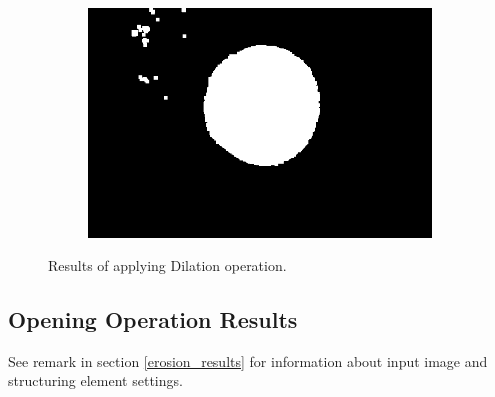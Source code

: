 \documentclass{article}
\begin{document}
\begin{figure}[H]
\begin{subfigure}{.09\textwidth}
  \label{fig:arrow}
\end{subfigure}%
\begin{subfigure}{.47\textwidth}
  \centering
  \includegraphics[width=0.97\linewidth]{_Figures/raw_data_4_dilation.png}
  \caption{}
  \label{fig:raw_4_dilation}
\end{subfigure}

\caption{Results of applying Dilation operation. }
\label{fig:dilation_results}
\end{figure}


%
%
\newpage
\subsection{Opening Operation Results}
See remark in section \ref{erosion_results} for information about input image and structuring element settings.
\end{document}
